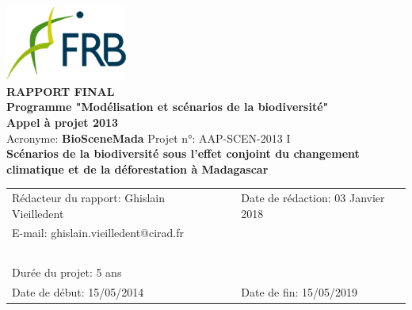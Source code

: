 \renewcommand{\bibsection}{}
\begin{center}
\includegraphics[width=4cm]{figures/FRB.png}\\
\vspace{1cm}
{\large
  \textbf{
    RAPPORT FINAL\\
    Programme "Modélisation et scénarios de la biodiversité"\\
    Appel à projet 2013\\
  }
}
\vspace{1cm}
Acronyme: \textbf{BioSceneMada} \hspace{2cm} Projet n°: AAP-SCEN-2013 I\\
\vspace{1cm}
{\Large \textbf{Scénarios de la biodiversité sous l'effet conjoint du changement climatique et de la déforestation à Madagascar}}\\
\vspace{1cm}
\begin{tabular}{lcl}
Rédacteur du rapport: Ghislain Vieilledent & \hspace{1cm} & Date de rédaction: 03 Janvier 2018\\
E-mail: ghislain.vieilledent@cirad.fr & \hspace{1cm} & ~ \\ 
~ & ~ \\
Durée du projet: 5 ans & \hspace{1cm} & ~ \\
Date de début: 15/05/2014 & \hspace{1cm} & Date de fin: 15/05/2019\\
\end{tabular}
\end{center}
\newpage